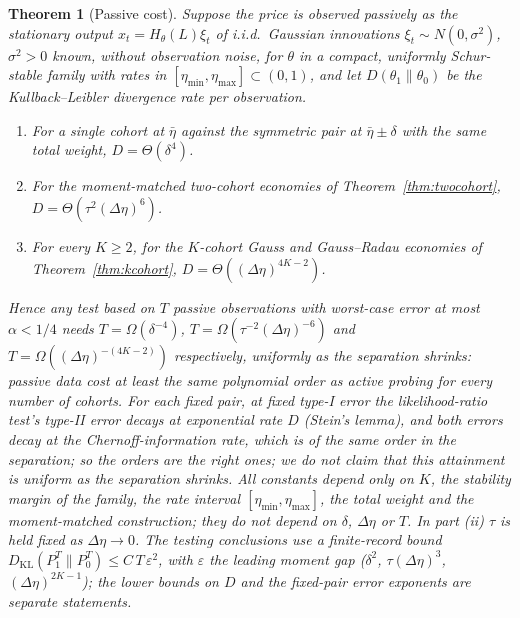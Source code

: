 \documentclass[12pt]{article}
\newtheorem{theorem}{Theorem}[section]
\theoremstyle{definition}
\theoremstyle{remark}
\newcommand{\KL}{D_{\mathrm{KL}}}
\begin{document}
\begin{theorem}[Passive cost]\label{prop:passive}
Suppose the price is observed passively as the stationary output $x_t=H_\theta(L)\xi_t$ of i.i.d.\ Gaussian innovations $\xi_t\sim N(0,\sigma^2)$, $\sigma^2>0$ known, without observation noise, for $\theta$ in a compact, uniformly Schur-stable family with rates in $[\eta_{\min},\eta_{\max}]\subset(0,1)$, and let $D(\theta_1\|\theta_0)$ be the Kullback--Leibler divergence rate per observation.
\begin{enumerate}[label=(\roman*)]
\item For a single cohort at $\bar\eta$ against the symmetric pair at $\bar\eta\pm\delta$ with the same total weight, $D=\Theta(\delta^4)$.
\item For the moment-matched two-cohort economies of Theorem~\ref{thm:twocohort}, $D=\Theta(\tau^2(\Delta\eta)^6)$.
\item For every $K\ge2$, for the $K$-cohort Gauss and Gauss--Radau economies of Theorem~\ref{thm:kcohort}, $D=\Theta((\Delta\eta)^{4K-2})$.
\end{enumerate}
Hence any test based on $T$ passive observations with worst-case error at most $\alpha<1/4$ needs $T=\Omega(\delta^{-4})$, $T=\Omega(\tau^{-2}(\Delta\eta)^{-6})$ and $T=\Omega((\Delta\eta)^{-(4K-2)})$ respectively, uniformly as the separation shrinks: passive data cost at least the same polynomial order as active probing for every number of cohorts. For each fixed pair, at fixed type-I error the likelihood-ratio test's type-II error decays at exponential rate $D$ (Stein's lemma), and both errors decay at the Chernoff-information rate, which is of the same order in the separation; so the orders are the right ones; we do not claim that this attainment is uniform as the separation shrinks. All constants depend only on $K$, the stability margin of the family, the rate interval $[\eta_{\min},\eta_{\max}]$, the total weight and the moment-matched construction; they do not depend on $\delta$, $\Delta\eta$ or $T$. In part (ii) $\tau$ is held fixed as $\Delta\eta\to0$. The testing conclusions use a finite-record bound $\KL(P_1^T\|P_0^T)\le C\,T\,\varepsilon^2$, with $\varepsilon$ the leading moment gap ($\delta^2$, $\tau(\Delta\eta)^3$, $(\Delta\eta)^{2K-1}$); the lower bounds on $D$ and the fixed-pair error exponents are separate statements.
\end{theorem}
\end{document}
